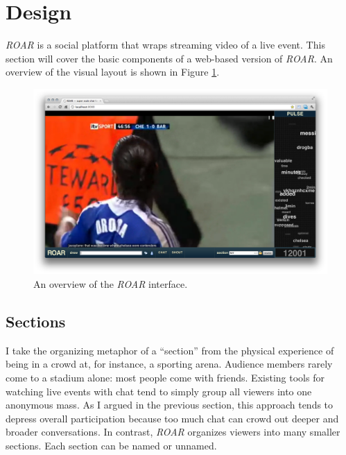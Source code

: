 



\section{Design}

\emph{ROAR} is a social platform that wraps streaming video of a live event. This section will cover the basic components of a web-based version of \emph{ROAR}. An overview of the visual layout is shown in Figure \ref{fig:roar_overview}. 

\begin{figure}[tb]
	\includegraphics{figures/roar/overview.png}
	\caption{An overview of the \emph{ROAR} interface.}
	\label{fig:roar_overview}
\end{figure}


\subsection{Sections}

I take the organizing metaphor of a ``section'' from the physical experience of being in a crowd at, for instance, a sporting arena. Audience members rarely come to a stadium alone: most people come with friends. Existing tools for watching live events with chat tend to simply group all viewers into one anonymous mass. As I argued in the previous section, this approach tends to depress overall participation because too much chat can crowd out deeper and broader conversations. In contrast, \emph{ROAR} organizes viewers into many  smaller sections. Each section can be named or unnamed. 

